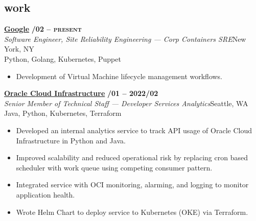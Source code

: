\documentclass[margin,10pt]{res}
\begin{document}
\begin{resume}
\section{\sc \lsstyle work}
    \href{https://about.google/}{\textbf{Google}} \hfill \textsc{\bfseries{}/02 -- present}\\
    \textit{Software Engineer, Site Reliability Engineering --- Corp Containers SRE}\hfill New York, NY\\
    Python, Golang, Kubernetes, Puppet
    \begin{itemize}
        \item Development of Virtual Machine lifecycle management workflows.
    \end{itemize}

    \href{https://www.oracle.com/cloud/}{\textbf{Oracle Cloud Infrastructure}} \hfill \textsc{\bfseries{}/01 -- 2022/02}\\
    \textit{Senior Member of Technical Staff --- Developer Services Analytics}\hfill Seattle, WA\\
    Java, Python, Kubernetes, Terraform
    \begin{itemize}
        \item Developed an internal analytics service to track API usage of Oracle Cloud Infrastructure in Python and Java.
        \item Improved scalability and reduced operational risk by replacing cron based scheduler with work queue using competing
        consumer pattern.
        \item Integrated service with OCI monitoring, alarming, and logging to monitor application health.
        \item Wrote Helm Chart to deploy service to Kubernetes (OKE) via Terraform.
    \end{itemize}


\end{resume}
\end{document}
